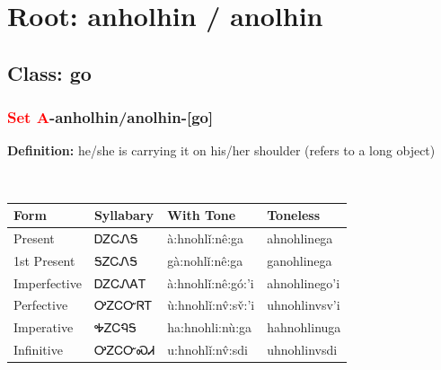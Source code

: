 \needspace{4in}
\section*{Root: anholhin / anolhin}
\nopagebreak
{}
\needspace{3in}
\subsection*{Class: go}
\nopagebreak
\needspace{2in}
\subsubsection*{\textcolor{Red}{Set A}{-}\textbf{anholhin/anolhin}{-}[go]}
\nopagebreak
\textbf{Definition: } he/she is carrying it on his/her shoulder (refers to a long object)
\\[0.5em]
\begin{tabularx}{\textwidth}{l X X X}%
\toprule%
\textbf{Form}&\textbf{Syllabary}&\textbf{With Tone}&\textbf{Toneless}\\%
\midrule%
Present&ᎠᏃᏟᏁᎦ&à:hnohlǐ:nê:ga&ahnohlinega\\%
1st Present&ᎦᏃᏟᏁᎦ&gà:nohlǐ:nê:ga&ganohlinega\\%
Imperfective&ᎠᏃᏟᏁᎪᎢ&à:hnohlǐ:nê:gó:’i&ahnohlinego’i\\%
Perfective&ᎤᏃᏟᏅᏒᎢ&ù:hnohlǐ:nv̂:sv̌:’i&uhnohlinvsv’i\\%
Imperative&ᎭᏃᏟᏄᎦ&ha:hnohli:nù:ga&hahnohlinuga\\%
Infinitive&ᎤᏃᏟᏅᏍᏗ&u:hnohlǐ:nv̂:sdi&uhnohlinvsdi\\%
\bottomrule%
\end{tabularx}
\\[1em]